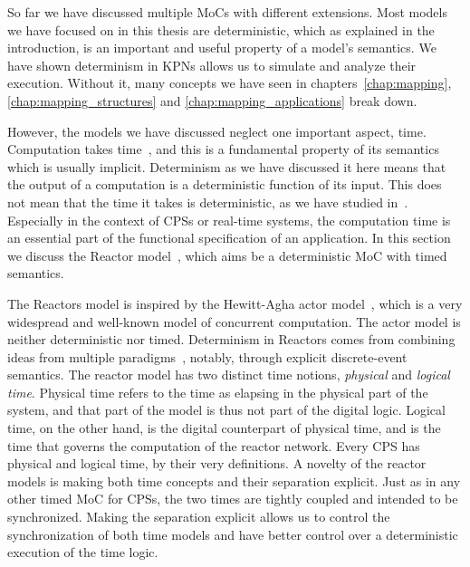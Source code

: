 So far we have discussed multiple \acp{MoC} with different extensions.
Most models we have focused on in this thesis are deterministic, which as explained in the introduction, is an important and useful property of a model's semantics.
We have shown determinism in \acp{KPN} allows us to simulate and analyze their execution.
Without it, many concepts we have seen in chapters~\ref{chap:mapping},\ref{chap:mapping_structures} and \ref{chap:mapping_applications} break down.

However, the models we have discussed neglect one important aspect, time.
Computation takes time~\cite{lee2009computing}, and this is a fundamental property of its semantics which is usually implicit.
Determinism as we have discussed it here means that the output of a computation is a deterministic function of its input.
This does not mean that the time it takes is deterministic, as we have studied in~\cite{goens_scopes17}.
Especially in the context of \acp{CPS} or real-time systems, the computation time is an essential part of the functional specification of an application.
In this section we discuss the Reactor model~\cite{lohstroh_dac19}, which aims be a deterministic \ac{MoC} with timed semantics.

The Reactors model is inspired by the Hewitt-Agha actor model~\cite{Agha:86:Actors}, which is a very widespread and well-known model of concurrent computation.
The actor model is neither deterministic nor timed.
Determinism in Reactors comes from combining ideas from multiple paradigms~\cite{lohstroh_fdl19}, notably, through explicit discrete-event semantics.
The reactor model has two distinct time notions, \emph{physical} and \emph{logical time}.
Physical time refers to the time as elapsing in the physical part of the system, and that part of the model is thus not part of the digital logic.
Logical time, on the other hand, is the digital counterpart of physical time, and is the time that governs the computation of the reactor network.
Every \ac{CPS} has physical and logical time, by their very definitions. A novelty of the reactor models is making both time concepts and their separation explicit.
Just as in any other timed \ac{MoC} for \acp{CPS}, the two times are tightly coupled and intended to be synchronized. 
Making the separation explicit allows us to control the synchronization of both time models and have better control over a deterministic execution of the time logic.

